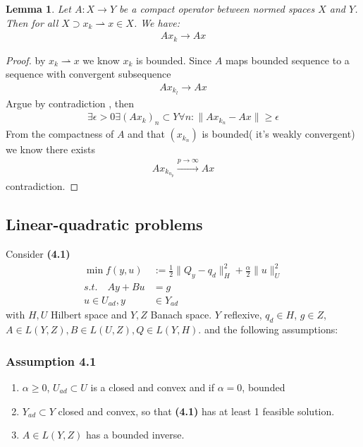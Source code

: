 \documentclass[a4paper,11pt,fleqn]{book}
\newtheorem{lemma}[theorem]{Lemma}
\theoremstyle{definition}
\theoremstyle{remark}
\begin{document}
\begin{lemma}
	Let $A: X \rightarrow Y$ be a compact operator between normed spaces $X$ and $Y$. Then for all $X \supset x_k \rightharpoonup x \in X$. We have:
	\begin{align*}
		Ax_k \rightarrow Ax
	\end{align*}
\end{lemma}
\begin{proof}
	by $x_k \rightharpoonup x$ we know $x_k$ is bounded. Since $A$ maps bounded sequence to a sequence with convergent subsequence
	\begin{align*}
		Ax_{k_l} \rightarrow Ax
	\end{align*} 
	Argue by contradiction , then 
	\begin{align*}
		\exists \epsilon > 0 \exists (Ax_k)_n \subset Y \forall n : \|Ax_{k_n} - Ax \| \ge \epsilon
	\end{align*}
	From the compactness of $A$ and that $(x_{k_n})$ is bounded( it's weakly convergent) we know there exists
	\begin{align*}
		Ax_{k_{n_p}} \overset{p \rightarrow \infty}{\rightarrow} Ax
	\end{align*}
	contradiction. 
\end{proof}

\subsection{Linear-quadratic problems}
Consider \textbf{(4.1)}
\begin{align*}
	\min f(y, u) &:= \frac{1}{2}\|Q_y - q_d \|_H^2 + \frac{\alpha}{2}\|u\|_U^2\\
	s.t. \quad Ay + Bu &= g\\
	u \in U_{ad}, y &\in Y_{ad}
\end{align*}
with $H, U$ Hilbert space and $Y, Z$ Banach space. $Y$ reflexive, $q_d \in H$, $g \in Z$, $A \in L(Y, Z), B \in L(U, Z), Q \in L(Y, H)$. and the following assumptions:

\subsubsection*{Assumption 4.1}
\begin{enumerate}
	\item $\alpha \geq 0$, $U_{ad} \subset U$ is a closed and convex and if $\alpha = 0$, bounded
	\item $Y_{ad} \subset Y$ closed and convex, so that \textbf{(4.1)} has at least 1 feasible solution. 
	\item $A \in L(Y, Z)$ has a bounded inverse. 
\end{enumerate} 
\end{document}
